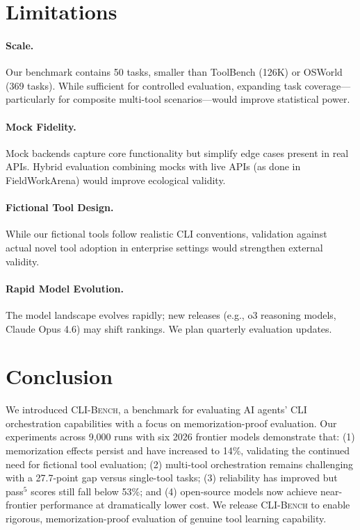 \documentclass{article}
\newcommand{\clibench}{\textsc{CLI-Bench}}
\begin{document}
\section{Limitations}
\label{sec:limitations}

\paragraph{Scale.} Our benchmark contains 50 tasks, smaller than ToolBench (126K) or OSWorld (369 tasks). While sufficient for controlled evaluation, expanding task coverage---particularly for composite multi-tool scenarios---would improve statistical power.

\paragraph{Mock Fidelity.} Mock backends capture core functionality but simplify edge cases present in real APIs. Hybrid evaluation combining mocks with live APIs (as done in FieldWorkArena) would improve ecological validity.

\paragraph{Fictional Tool Design.} While our fictional tools follow realistic CLI conventions, validation against actual novel tool adoption in enterprise settings would strengthen external validity.

\paragraph{Rapid Model Evolution.} The model landscape evolves rapidly; new releases (e.g., o3 reasoning models, Claude Opus 4.6) may shift rankings. We plan quarterly evaluation updates.

\section{Conclusion}
\label{sec:conclusion}

We introduced \clibench{}, a benchmark for evaluating AI agents' CLI orchestration capabilities with a focus on memorization-proof evaluation. Our experiments across 9,000 runs with six 2026 frontier models demonstrate that: (1) memorization effects persist and have increased to 14\%, validating the continued need for fictional tool evaluation; (2) multi-tool orchestration remains challenging with a 27.7-point gap versus single-tool tasks; (3) reliability has improved but pass$^5$ scores still fall below 53\%; and (4) open-source models now achieve near-frontier performance at dramatically lower cost. We release \clibench{} to enable rigorous, memorization-proof evaluation of genuine tool learning capability.
\end{document}
